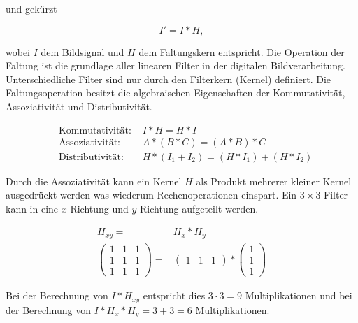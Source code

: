 und gekürzt

\begin{equation}
	I' = I * H,
\end{equation}

wobei $I$ dem Bildsignal und $H$ dem Faltungskern entspricht. Die Operation der Faltung ist die grundlage aller
 linearen Filter in der digitalen Bildverarbeitung. Unterschiedliche Filter sind nur durch den Filterkern (Kernel)
 definiert. Die Faltungsoperation besitzt die algebraischen Eigenschaften der Kommutativität, Assoziativität und
 Distributivität.

\begin{align}
	&\text{Kommutativität: } &I * H = H * I\\
	&\text{Assoziativität: } &A * (B * C) = (A * B) * C\\
	&\text{Distributivität: } &H * \left(I_1 + I_2\right) = \left(H * I_1\right) + \left(H * I_2\right)
\end{align}

Durch die Assoziativität kann ein Kernel $H$ als Produkt mehrerer kleiner Kernel ausgedrückt werden was wiederum
 Rechenoperationen einspart. Ein $3 \times 3$ Filter kann in eine $x$-Richtung und $y$-Richtung aufgeteilt werden.

\begin{align}
	H_{xy} = & H_x * H_y\\
	\begin{pmatrix}
		1& 1& 1\\
		1& 1& 1\\
		1& 1& 1
	\end{pmatrix} = &
	\begin{pmatrix}
		1& 1& 1
	\end{pmatrix}
	*
	\begin{pmatrix}
		1\\
		1\\
		1
	\end{pmatrix}
\end{align}

Bei der Berechnung von $I * H_{xy}$ entspricht dies $3 \cdot 3 = 9$ Multiplikationen und bei der Berechnung von
 $I * H_x * H_y = 3 + 3 = 6$ Multiplikationen.


